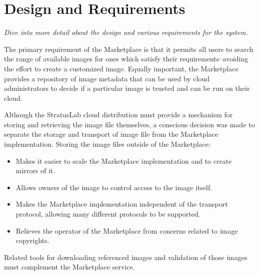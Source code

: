 \section{Design and Requirements}
\label{sec:requirements}

{\em Dive into more detail about the design and various requirements
  for the system.}

The primary requirement of the Marketplace is that it permits all
users to search the range of available images for ones which satisfy
their requirements--avoiding the effort to create a customized image.
Equally important, the Marketplace provides a repository of image
metadata that can be used by cloud administrators to decide if a
particular image is trusted and can be run on their cloud.

Although the StratusLab cloud distribution must provide a mechanism
for storing and retrieving the image file themselves, a conscious
decision was made to separate the storage and transport of image file
from the Marketplace implementation.  Storing the image files outside
of the Marketplace:
\begin{itemize}
\item Makes it easier to scale the Marketplace implementation and to
  create mirrors of it.
\item Allows owners of the image to control access to the image
  itself.
\item Makes the Marketplace implementation independent of the
  transport protocol, allowing many different protocols to be
  supported.
\item Relieves the operator of the Marketplace from concerns related
  to image copyrights.
\end{itemize}
Related tools for downloading referenced images and validation of
those images must complement the Marketplace service.

